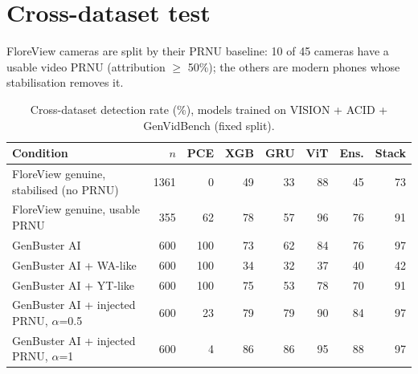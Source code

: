 \documentclass[11pt,a4paper]{article}
\begin{document}
\section{Cross-dataset test}
FloreView cameras are split by their PRNU baseline: 10 of 45 cameras have a usable video PRNU (attribution $\geq$ 50\%); the others are modern phones whose stabilisation removes it.
\begin{table}[H]\centering\small\caption{Cross-dataset detection rate (\%), models trained on VISION + ACID + GenVidBench (fixed split).}\label{tab:cross}\begin{tabular}{p{6.4cm}rrrrrrr}\toprule Condition & $n$ & PCE & XGB & GRU & ViT & Ens. & Stack \\\midrule
FloreView genuine, stabilised (no PRNU) & 1361 & 0 & 49 & 33 & 88 & 45 & 73 \\
FloreView genuine, usable PRNU & 355 & 62 & 78 & 57 & 96 & 76 & 91 \\
GenBuster AI & 600 & 100 & 73 & 62 & 84 & 76 & 97 \\
GenBuster AI + WA-like & 600 & 100 & 34 & 32 & 37 & 40 & 42 \\
GenBuster AI + YT-like & 600 & 100 & 75 & 53 & 78 & 70 & 91 \\
GenBuster AI + injected PRNU, $\alpha$=0.5 & 600 & 23 & 79 & 79 & 90 & 84 & 97 \\
GenBuster AI + injected PRNU, $\alpha$=1 & 600 & 4 & 86 & 86 & 95 & 88 & 97 \\
\bottomrule\end{tabular}\end{table}
\end{document}
